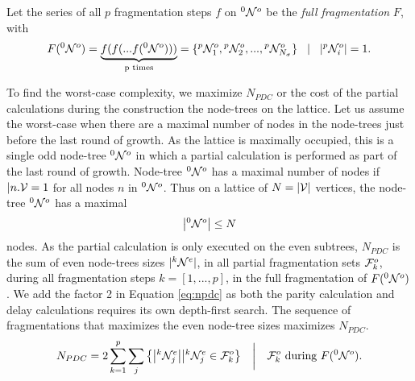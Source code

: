 \begin{definition}\label{def:fullfrag}
  Let the series of all $p$ fragmentation steps $f$ on ${}^{0}\mathcal{N}^o$ be the \emph{full fragmentation} $F$, with
  \begin{equation}\label{eq:fullfrag}
    F({}^{0}\mathcal{N}^o) = \underbrace{f(f(...f({}^{0}\mathcal{N}^o)))}_\text{p times} = \{{}^{p}\mathcal{N}^{o}_1, {}^{p}\mathcal{N}^{o}_2,...,{}^{p}\mathcal{N}^{o}_{N_\sigma} \} \hspace{.3cm} | \hspace{.3cm} \abs{{}^{p}\mathcal{N}^{o}_i} = 1.
  \end{equation}
\end{definition}

To find the worst-case complexity, we maximize $N_{PDC}$ or the cost of the partial calculations during the construction the node-trees on the lattice. Let us assume the worst-case when there are a maximal number of nodes in the node-trees just before the last round of growth. As the lattice is maximally occupied, this is a single odd node-tree ${}^{0}\mathcal{N}^o$ in which a partial calculation is performed as part of the last round of growth. Node-tree ${}^{0}\mathcal{N}^o$ has a maximal number of nodes if $|n.\mathcal{V}=1$ for all nodes $n$ in ${}^{0}\mathcal{N}^o$. Thus on a lattice of $N=|\mathcal{V}|$ vertices, the node-tree ${}^{0}\mathcal{N}^o$ has a maximal 
\begin{equation}\label{eq:limitnsetsize}
  \abs{{}^{0}\mathcal{N}^o} \leq N
\end{equation}
nodes. As the partial calculation is only executed on the even subtrees, $N_{PDC}$ is the sum of even node-trees sizes $|{}^{k}\mathcal{N}^e|$, in all partial fragmentation sets $\mathcal{F}^o_{k}$, during all fragmentation steps $k=[1,...,p]$, in the full fragmentation of $F({}^{0}\mathcal{N}^o)$. We add the factor 2 in Equation \eqref{eq:npdc} as both the parity calculation and delay calculations requires its own depth-first search. The sequence of fragmentations that maximizes the even node-tree sizes maximizes $N_{PDC}$.
\begin{equation}\label{eq:npdc}
  N_{PDC} = 2\sum_{k=1}^{p}{ \sum_j{ \left\{ \abs{{}^{k}\mathcal{N}_j^e} \big| {}^{k}\mathcal{N}_j^e \in \mathcal{F}^o_k \right\} } }
  \hspace{1em} \bigg| \hspace{1em} \mathcal{F}_k^o \text{ during } F({}^{0}\mathcal{N}^o).
\end{equation}


